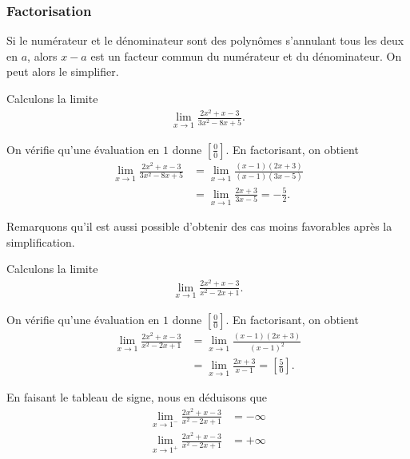 \documentclass[main.tex]{subfiles}
\begin{document}
\subsubsection{Factorisation}

Si le numérateur et le dénominateur sont des polynômes s'annulant tous les deux en $a$,
alors $x - a$ est un facteur commun du numérateur et du dénominateur.
On peut alors le simplifier.

\begin{example}

    Calculons la limite
    \begin{align}
        \lim_{x \to 1} \frac {2x^2 + x - 3} {3x^2 - 8x + 5}.
    \end{align}

    On vérifie qu'une évaluation en $1$ donne $[\frac 0 0]$.
    En factorisant, on obtient
    \begin{align}
        \lim_{x \to 1} \frac {2x^2 + x - 3} {3x^2 - 8x + 5}
        &= \lim_{x \to 1} \frac {(x - 1)(2x + 3)} {(x - 1)(3x - 5)}\\
        &= \lim_{x \to 1} \frac {2x + 3} {3x - 5} = - \frac 5 2.
    \end{align}
\end{example}

Remarquons qu'il est aussi possible d'obtenir des cas moins favorables après la simplification.

\begin{example}

    Calculons la limite
    \begin{align}
        \lim_{x \to 1} \frac {2x^2 + x - 3} {x^2 - 2x + 1}.
    \end{align}

    On vérifie qu'une évaluation en $1$ donne $[\frac 0 0]$.
    En factorisant, on obtient
    \begin{align}
        \lim_{x \to 1} \frac {2x^2 + x - 3} {x^2 - 2x + 1}
        &= \lim_{x \to 1} \frac {(x - 1)(2x + 3)} {{(x - 1)}^2}\\
        &= \lim_{x \to 1} \frac {2x + 3} {x - 1} = \left[\frac 5 0\right].
    \end{align}

    En faisant le tableau de signe,
    nous en déduisons que
    \begin{align}
        \lim_{x \to 1^-} \frac {2x^2 + x - 3} {x^2 - 2x + 1} &= -\infty\\
        \lim_{x \to 1^+} \frac {2x^2 + x - 3} {x^2 - 2x + 1} &= +\infty
    \end{align}
\end{example}
\end{document}
